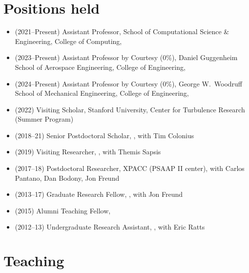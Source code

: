 \section{Positions held}

\begin{itemize}
    \item (2021--Present) Assistant Professor, School of Computational Science \& Engineering, College of Computing, \GIT
    \item (2023--Present) Assistant Professor by Courtesy (0\%), Daniel Guggenheim School of Aerospace Engineering, College of Engineering, \GIT
    \item (2024--Present) Assistant Professor by Courtesy (0\%), George W.\ Woodruff School of Mechanical Engineering, College of Engineering, \GIT
    \item (2022) Visiting Scholar, Stanford University, Center for Turbulence Research (Summer Program)
    \item (2018--21) Senior Postdoctoral Scholar, \CIT, with Tim Colonius
    \item (2019) Visiting Researcher, \MIT, with Themis Sapsis
    \item (2017--18) Postdoctoral Researcher, XPACC (PSAAP II center), with Carlos Pantano, Dan Bodony, Jon Freund
    \item (2013--17) Graduate Research Fellow, \UIUC, with Jon Freund
    \item (2015) Alumni Teaching Fellow, \UIUC
    \item (2012--13) Undergraduate Research Assistant, \UMD, with Eric Ratts
\end{itemize}

\section{Teaching}

\subsection{\GIT}

